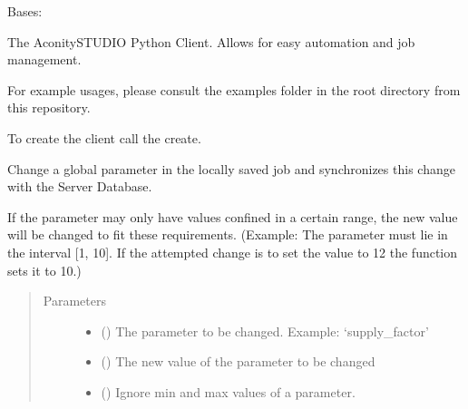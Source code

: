 \documentclass[letterpaper,10pt,english,openany,oneside]{sphinxmanual}
\begin{document}
\begin{fulllineitems}
\label{\detokenize{_modules/AconitySTUDIO_client:AconitySTUDIO_client.AconitySTUDIO_client}}
Bases: 

The AconitySTUDIO Python Client. Allows for easy automation and job
management.

For example usages, please consult the examples folder
in the root directory from this repository.

To create the client call the  create.

\begin{fulllineitems}
\label{\detokenize{_modules/AconitySTUDIO_client:AconitySTUDIO_client.AconitySTUDIO_client.change_global_parameter}}
Change a global parameter in the locally saved job and synchronizes this change with the Server Database.

If the parameter may only have values confined in a certain range, the new value will be changed to fit these requirements.
(Example: The parameter must lie in the interval {[}1, 10{]}. If the attempted change is to set the value to 12 the function sets it to 10.)
\begin{quote}\begin{description}
\item[{Parameters}] \leavevmode\begin{itemize}
\item {} 
 () \textendash{} The parameter to be changed. Example: ‘supply\_factor’

\item {} 
 () \textendash{} The new value of the parameter to be changed

\item {} 
 () \textendash{} Ignore min and max values of a parameter.


\end{itemize}
\end{description}
\end{quote}
\end{fulllineitems}
\end{fulllineitems}
\end{document}
